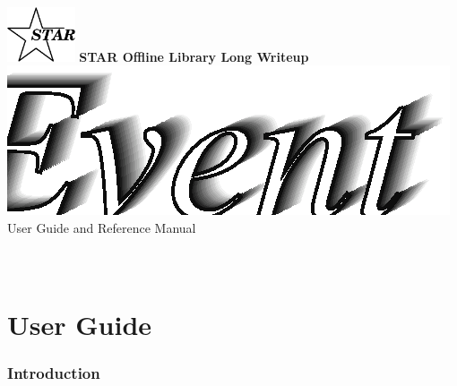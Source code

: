 %
%
\begin{titlepage}
\pagestyle{empty}
\vspace*{-35mm}
\begin{center}
  \mbox{\includegraphics[width=2cm]{StarIcon.eps}}
  {\Large\bf STAR Offline Library Long Writeup}
  \hfill\mbox{}\\[3cm]
  \mbox{\includegraphics[width=\textwidth]{StMcEventTitle.eps}}
  \hfill\mbox{}\\[3cm]
  {\LARGE User Guide and Reference Manual}\\[2cm]
  {\LARGE $  $}  \\[5mm] %
  {\LARGE $  $}  %
  \vfill
\end{center}
\cleardoublepage
\end{titlepage}

%
%
\tableofcontents
\cleardoublepage

%
%
\part{User Guide}
\clearpage


\section{Introduction}

